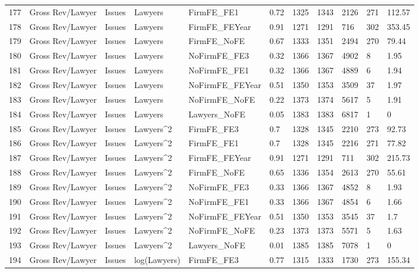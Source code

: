 \documentclass{article}
\begin{document}
\begin{table}[H]
\begin{tabular}{rllllllllll}
  177 & Gross Rev/Lawyer & Issues & Lawyers & FirmFE\_FE1 & 0.72 & 1325 & 1343 & 2126 & 271 & 112.57 \\ 
  178 & Gross Rev/Lawyer & Issues & Lawyers & FirmFE\_FEYear & 0.91 & 1271 & 1291 & 716 & 302 & 353.45 \\ 
  179 & Gross Rev/Lawyer & Issues & Lawyers & FirmFE\_NoFE & 0.67 & 1333 & 1351 & 2494 & 270 & 79.44 \\ 
  180 & Gross Rev/Lawyer & Issues & Lawyers & NoFirmFE\_FE3 & 0.32 & 1366 & 1367 & 4902 & 8 & 1.95 \\ 
  181 & Gross Rev/Lawyer & Issues & Lawyers & NoFirmFE\_FE1 & 0.32 & 1366 & 1367 & 4889 & 6 & 1.94 \\ 
  182 & Gross Rev/Lawyer & Issues & Lawyers & NoFirmFE\_FEYear & 0.51 & 1350 & 1353 & 3509 & 37 & 1.97 \\ 
  183 & Gross Rev/Lawyer & Issues & Lawyers & NoFirmFE\_NoFE & 0.22 & 1373 & 1374 & 5617 & 5 & 1.91 \\ 
  184 & Gross Rev/Lawyer & Issues & Lawyers & Lawyers\_NoFE & 0.05 & 1383 & 1383 & 6817 & 1 & 0 \\ 
  185 & Gross Rev/Lawyer & Issues & Lawyers^2 & FirmFE\_FE3 & 0.7 & 1328 & 1345 & 2210 & 273 & 92.73 \\ 
  186 & Gross Rev/Lawyer & Issues & Lawyers^2 & FirmFE\_FE1 & 0.7 & 1328 & 1345 & 2216 & 271 & 77.82 \\ 
  187 & Gross Rev/Lawyer & Issues & Lawyers^2 & FirmFE\_FEYear & 0.91 & 1271 & 1291 & 711 & 302 & 215.73 \\ 
  188 & Gross Rev/Lawyer & Issues & Lawyers^2 & FirmFE\_NoFE & 0.65 & 1336 & 1354 & 2613 & 270 & 55.61 \\ 
  189 & Gross Rev/Lawyer & Issues & Lawyers^2 & NoFirmFE\_FE3 & 0.33 & 1366 & 1367 & 4852 & 8 & 1.93 \\ 
  190 & Gross Rev/Lawyer & Issues & Lawyers^2 & NoFirmFE\_FE1 & 0.33 & 1366 & 1367 & 4854 & 6 & 1.66 \\ 
  191 & Gross Rev/Lawyer & Issues & Lawyers^2 & NoFirmFE\_FEYear & 0.51 & 1350 & 1353 & 3545 & 37 & 1.7 \\ 
  192 & Gross Rev/Lawyer & Issues & Lawyers^2 & NoFirmFE\_NoFE & 0.23 & 1373 & 1373 & 5571 & 5 & 1.63 \\ 
  193 & Gross Rev/Lawyer & Issues & Lawyers^2 & Lawyers\_NoFE & 0.01 & 1385 & 1385 & 7078 & 1 & 0 \\ 
  194 & Gross Rev/Lawyer & Issues & log(Lawyers) & FirmFE\_FE3 & 0.77 & 1315 & 1333 & 1730 & 273 & 155.34 \\ 

\end{tabular}
\end{table}
\end{document}
